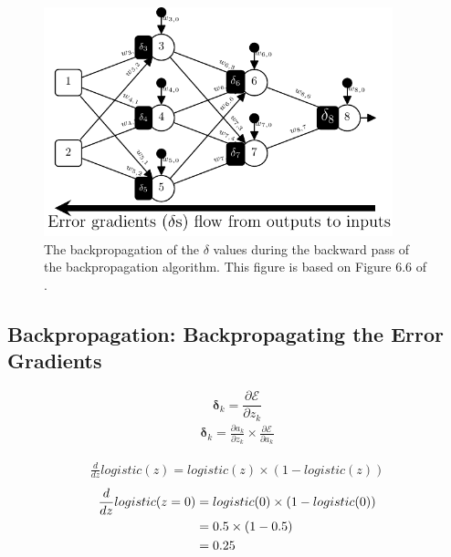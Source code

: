 \documentclass[xcolor={table}]{beamer}
\begin{document}
 \begin{frame} 
\begin{figure}[t]
\centerline{
\includegraphics[width=0.9\textwidth]{./images/fmlpda_8_12.pdf}
}
\caption{The backpropagation of the $\delta$ values during the backward pass of the backpropagation algorithm. This figure is based on Figure 6.6 of \citep{kelleher:2019}.}
\label{fig:BPropBackward}
\end{figure}
\end{frame} 


\subsection{Backpropagation: Backpropagating the Error Gradients}

 \begin{frame} 
\begin{equation}
\boldsymbol{\delta}_k= \frac{\partial \mathcal{E}}{\partial z_k}
\label{eq:deltadefintion}
\end{equation}
\begin{eqnarray}
\boldsymbol{\delta}_k =  \frac{\partial a_k}{\partial z_k} \times \frac{\partial \mathcal{E}}{\partial a_k} 
\label{eq:deltaproduct}
\end{eqnarray}
\end{frame} 


 \begin{frame} 
\begin{eqnarray}
	\frac{d}{dz} logistic(z) =  logistic(z) \times (1 - logistic(z)) 
	\label{eqn:derivativeLogisticNNexample}
\end{eqnarray}
\begin{alignat}{2}
	\frac{d}{dz} logistic(z=0) & =  logistic(0) \times (1 - logistic(0)) \notag\\
	 & =  0.5 \times (1 - 0.5) \notag\\
	 & =  0.25 \notag\\
	\label{eqn:derivativeLogisticExam}
\end{alignat}
\end{frame} 
\end{document}
